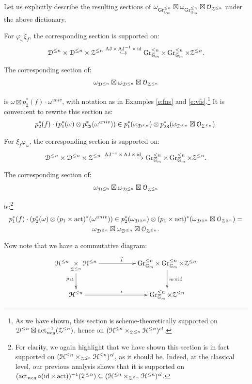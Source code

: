 \documentclass[reqno,11pt]{amsart}
\numberwithin{equation}{subsection}
\theoremstyle{remark}
\newcommand{\xar}[1]{\xrightarrow{#1}}
\newcommand{\into}{\hookrightarrow}
\newcommand{\bG}{{\mathbb G}}
\newcommand{\sD}{{\EuScript D}}
\newcommand{\sH}{{\EuScript H}}
\newcommand{\sO}{{\EuScript O}}
\newcommand{\sZ}{{\EuScript Z}}
\newcommand{\on}{\operatorname}
\newcommand{\id}{\on{id}}
\newcommand{\act}{\on{act}}
\newcommand{\vph}{\varphi}
\newcommand{\Gr}{\on{Gr}}
\newcommand{\AJ}{\on{AJ}}
\renewcommand{\subset}{\subseteq}
\begin{document}
Let us explicitly describe the resulting sections of 
$\omega_{\Gr_{\bG_m}^{\leq n}} \boxtimes \omega_{\Gr_{\bG_m}^{\leq n}} 
\boxtimes \sO_{\sZ^{\leq n}}$ under the
above dictionary.

For $\vph_{\omega}\xi_f$, the corresponding section
is supported on:
%
\[
\sD^{\leq n} \times \sD^{\leq n} \times \sZ^{\leq n}
\overset{\AJ \times \AJ^{-1} \times \id}{\into}
\Gr_{\bG_m}^{\leq n} \times \Gr_{\bG_m}^{\leq n} 
\times \sZ^{\leq n}.
\]

\noindent The corresponding section of:
%
\[
\omega_{\sD^{\leq n}} \boxtimes 
\omega_{\sD^{\leq n}} \boxtimes \sO_{\sZ^{\leq n}}
\]

\noindent is $\omega \boxtimes p_2^*(f)\cdot\omega^{univ}$,
with notation as in Examples \ref{e:fns} and \ref{e:vfs}.\footnote{As
we have shown, this section is scheme-theoretically supported
on $\sD^{\leq n} \boxtimes \act_{neg}^{-1}(\sZ^{\leq n})$,
hence on $(\sH^{\leq n} \times_{\sZ^{\leq n}}\sH^{\leq n})^{cl}$.} It is convenient to 
rewrite this section as:
%
\[
p_2^*(f) \cdot (p_1^*(\omega) \otimes p_{23}^*(\omega^{univ})) \in 
p_1^*(\omega_{\sD^{\leq n}}) \otimes 
p_{23}^*(\omega_{\sD^{\leq n}} \boxtimes \sO_{\sZ^{\leq n}}).
\]

For $\xi_f\vph_{\omega}$, the corresponding section
is supported on:
%
\[
\sD^{\leq n} \times \sD^{\leq n} \times \sZ^{\leq n}
\xar{\AJ^{-1} \times \AJ \times \id}
\Gr_{\bG_m}^{\leq n} \times \Gr_{\bG_m}^{\leq n} 
\times \sZ^{\leq n}.
\]

\noindent The corresponding section of:
%
\[
\omega_{\sD^{\leq n}} \boxtimes 
\omega_{\sD^{\leq n}} \boxtimes \sO_{\sZ^{\leq n}}
\]

\noindent is:\footnote{For clarity, we again
highlight that we have shown
this section is in fact supported on 
$(\sH^{\leq n} \times_{\sZ^{\leq n}}\sH^{\leq n})^{cl}$, as
it should be. Indeed, at the classical level, our previous
analysis shows that it is
supported on 
$(\act_{neg}\circ (\id\times\act))^{-1} (\sZ^{\leq n}) 
\subset  (\sH^{\leq n} \times_{\sZ^{\leq n}}\sH^{\leq n})^{cl}$.}
%
\[
\begin{gathered}
p_1^*(f) \cdot 
(p_2^*(\omega) \otimes (p_1\times \act)^*(\omega^{univ})) \in 
p_2^*(\omega_{\sD^{\leq n}}) \otimes 
(p_1\times \act)^*(\omega_{\sD^{\leq n}} \boxtimes \sO_{\sZ^{\leq n}}) = \\
\omega_{\sD^{\leq n}} \boxtimes \omega_{\sD^{\leq n}} 
\boxtimes \sO_{\sZ^{\leq n}}.
\end{gathered}
\]

Now note that we have a commutative diagram:
%
\[
\xymatrix{
\sH^{\leq n} \underset{\sZ^{\leq n}}{\times} \sH^{\leq n} 
\ar[rr]^{\widetilde{\iota}} \ar[d]_{p_{13}} &&
\Gr_{\bG_m}^{\leq n} \times \Gr_{\bG_m}^{\leq n} \times \sZ^{\leq n} 
\ar[d]^{m\times \id} \\
\sH^{\leq n} \ar[rr]^{\iota} && \Gr_{\bG_m}^{\leq n} \times \sZ^{\leq n}
}
\]
\end{document}
